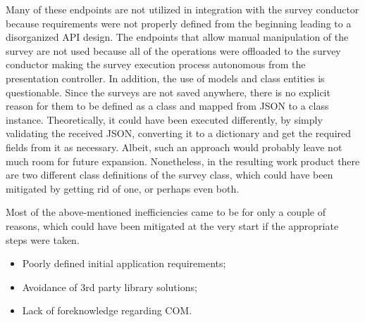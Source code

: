 \documentclass[12pt, fleqn, a4paper]{article}
\begin{document}
Many of these endpoints are not utilized in integration with the survey conductor because requirements were not properly defined from the beginning leading to a disorganized API design. The endpoints that allow manual manipulation of the survey are not used because all of the operations were offloaded to the survey conductor making the survey execution process autonomous from the presentation controller.
In addition, the use of models and class entities is questionable. Since the surveys are not saved anywhere, there is no explicit reason for them to be defined as a class and mapped from JSON to a class instance. 
Theoretically, it could have been executed differently, by simply validating the received JSON, converting it to a dictionary and get the required fields from it as necessary. Albeit, such an approach would probably leave not much room for future expansion.
Nonetheless, in the resulting work product there are two different class definitions of the survey class, which could have been mitigated by getting rid of one, or perhaps even both.\par
Most of the above-mentioned inefficiencies came to be for only a couple of reasons, which could have been mitigated at the very start if the appropriate steps were taken.
\begin{itemize}
	\item Poorly defined initial application requirements;
	\item Avoidance of 3rd party library solutions;
	\item Lack of foreknowledge regarding COM.
\end{itemize}
\end{document}
